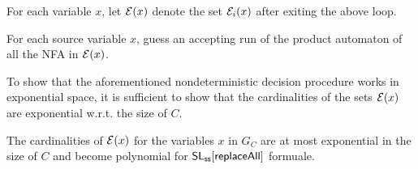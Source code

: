 For each variable $x$, let $\mathcal{E}(x)$ denote the set $\mathcal{E}_i(x)$ after exiting the above loop. 

\smallskip

For each source variable $x$, guess an accepting run of the product automaton of all the NFA in $\mathcal{E}(x)$. 

\smallskip


To show that the aforementioned nondeterministic decision procedure works in exponential space, it is sufficient to show that the cardinalities of the sets $\mathcal{E}(x)$ are exponential w.r.t. the size of $C$. 

\begin{proposition}
The cardinalities of $\mathcal{E}(x)$ for the variables $x$ in $G_C$ are at most exponential  in the size of $C$ and become polynomial for $\mathsf{SL}_{\sf ss}[\mathsf{replaceAll}]$ formuale.
\end{proposition}

